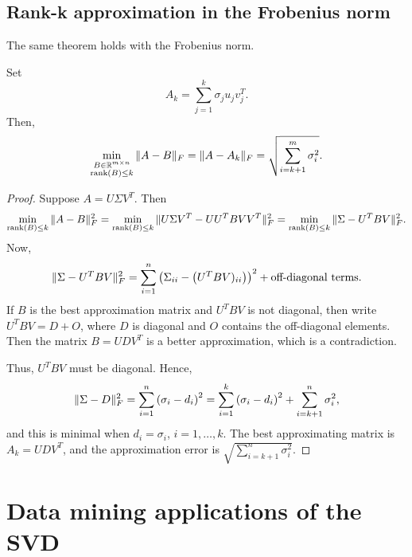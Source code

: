 \documentclass{article}
\begin{document}
\subsection*{Rank-k approximation in the Frobenius norm}

The same theorem holds with the Frobenius norm.
\begin{theorem} Set
\begin{equation*}
A_{k} = \sum_{j=1}^{k} \sigma_{j} u_{j} v_{j}^{T}.
\end{equation*}
Then,
\begin{equation*}
\min_{\substack{B \in \mathbb{R}^{m \times n} \\
\operatorname{rank}(B) \leq k}} \| A-B \|_{F} = \| A-A_{k} \|_{F}
= \sqrt{\sum_{i=k+1}^{m} \sigma_{i}^{2}}.
\end{equation*}
\end{theorem}
\begin{proof}
Suppose $A=U \Sigma V^{T}$. Then
\begin{equation*}
\min_{\operatorname{rank}(B) \leq k} \| A-B \|^{2}_{F} =
\min_{\operatorname{rank}(B) \leq k} \| U \Sigma V^{T} - UU^{T} B
VV^{T} \|^{2}_{F} = \min_{\operatorname{rank}(B) \leq k} \| \Sigma
- U^{T} B V \|^{2}_{F}.
\end{equation*}
Now,
\begin{equation*}
\| \Sigma - U^{T} B V \|^{2}_{F} = \sum_{i=1}^{n} \left (
\Sigma_{ii} - \left (U^{T}B V)_{ii} \right ) \right )^{2} +
\text{off-diagonal terms}.
\end{equation*}
If $B$ is the best approximation matrix and $U^{T}B V$ is not
diagonal, then write $U^{T}B V=D+O$, where $D$ is diagonal and $O$
contains the off-diagonal elements. Then the matrix $B = U D V^{T}$
is a better approximation, which is a contradiction.

Thus, $U^{T}B V$ must be diagonal. Hence,
\begin{equation*}
\| \Sigma - D \|^{2}_{F} = \sum_{i=1}^{n} \left (\sigma_{i} - d_{i}
\right )^{2} = \sum_{i=1}^{k} \left (\sigma_{i} - d_{i} \right )^{2}
+ \sum_{i=k+1}^{n} \sigma_{i}^{2},
\end{equation*}
and this is minimal when $d_{i}=\sigma_{i}$, $i=1,\ldots,k$. The
best approximating matrix is $A_{k} = U D V^{T}$, and the
approximation error is $\sqrt{\sum_{i=k+1}^{n} \sigma_{i}^{2}}$.
\end{proof}

\section*{Data mining applications of the SVD}
\end{document}
